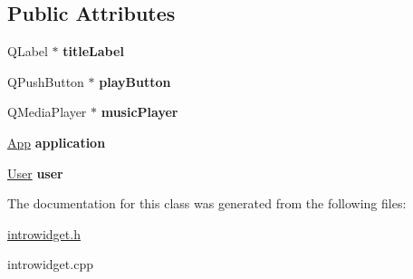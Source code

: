 \subsection*{Public Attributes}
\begin{DoxyCompactItemize}
\item 
\mbox{\label{classIntroWidget_a7334648aee88b10a0121d64119870ddb}} 
Q\+Label $\ast$ {\bfseries title\+Label}
\item 
\mbox{\label{classIntroWidget_a66a1ef5fb2f9d703d1165f5819e9d49c}} 
Q\+Push\+Button $\ast$ {\bfseries play\+Button}
\item 
\mbox{\label{classIntroWidget_a516359740b041ac4f0f9411699c4186c}} 
Q\+Media\+Player $\ast$ {\bfseries music\+Player}
\item 
\mbox{\label{classIntroWidget_a79af3655b0a4fd298b648911c65def38}} 
\hyperlink{classApp}{App} {\bfseries application}
\item 
\mbox{\label{classIntroWidget_ad12eea6cfe4e6897bb68a9f9b540d8bc}} 
\hyperlink{classUser}{User} {\bfseries user}
\end{DoxyCompactItemize}


The documentation for this class was generated from the following files\+:\begin{DoxyCompactItemize}
\item 
\hyperlink{introwidget_8h}{introwidget.\+h}\item 
introwidget.\+cpp\end{DoxyCompactItemize}
